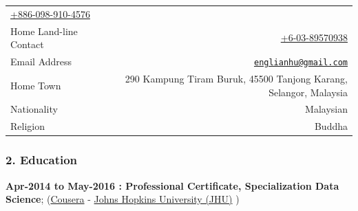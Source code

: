 \documentclass[]{article}
\begin{document}
\begin{longtable}[]{@{}lr@{}}
\begin{minipage}[t]{0.73\columnwidth}
\href{tel:+8860989104576}{+886-098-910-4576}\strut
\end{minipage}\tabularnewline
\begin{minipage}[t]{0.21\columnwidth}\raggedright\strut
Home Land-line Contact\strut
\end{minipage} & \begin{minipage}[t]{0.73\columnwidth}\raggedleft\strut
\href{tel:+60389570938}{+6-03-89570938}\strut
\end{minipage}\tabularnewline
\begin{minipage}[t]{0.21\columnwidth}\raggedright\strut
Email Address\strut
\end{minipage} & \begin{minipage}[t]{0.73\columnwidth}\raggedleft\strut
\href{mailto:englianhu@gmail.com}{\nolinkurl{englianhu@gmail.com}}\strut
\end{minipage}\tabularnewline
\begin{minipage}[t]{0.21\columnwidth}\raggedright\strut
Home Town\strut
\end{minipage} & \begin{minipage}[t]{0.73\columnwidth}\raggedleft\strut
290 Kampung Tiram Buruk, 45500 Tanjong Karang, Selangor, Malaysia\strut
\end{minipage}\tabularnewline
\begin{minipage}[t]{0.21\columnwidth}\raggedright\strut
Nationality\strut
\end{minipage} & \begin{minipage}[t]{0.73\columnwidth}\raggedleft\strut
Malaysian\strut
\end{minipage}\tabularnewline
\begin{minipage}[t]{0.21\columnwidth}\raggedright\strut
Religion\strut
\end{minipage} & \begin{minipage}[t]{0.73\columnwidth}\raggedleft\strut
Buddha\strut
\end{minipage}\tabularnewline
\bottomrule
\end{longtable}

\subsubsection{2. Education}\label{education}

\textbf{Apr-2014 to May-2016 : Professional Certificate, Specialization
Data Science}; (\href{http://www.coursera.org}{Cousera} -
\href{https://www.jhu.edu/}{Johns Hopkins University (JHU)} )
\end{document}
